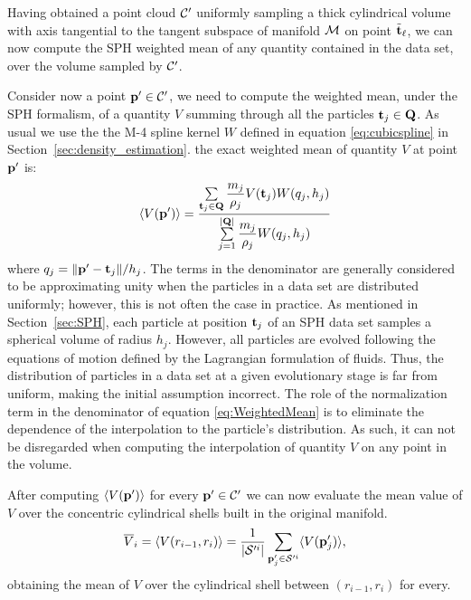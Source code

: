 Having obtained a point cloud $\mathcal{C}'$ uniformly sampling a thick cylindrical volume with axis tangential to the tangent subspace of manifold $\mathcal{M}$ on point $\tilde{\boldsymbol{\mathbf{t}}}_\ell$,
we can now compute the SPH weighted mean of any quantity contained in the data set, over the volume sampled by $\mathcal{C}'$.

Consider now a point $\boldsymbol{\mathbf{p}}' \in \mathcal{C}'$, we need to compute the weighted mean, under the SPH formalism, of a quantity $V$ summing through all the particles $\boldsymbol{\mathbf{t}}_j \in \boldsymbol{\mathbf{Q}}$.
As usual we use the the M-4 spline kernel $W$ defined in equation \eqref{eq:cubicspline} in Section~\ref{sec:density_estimation}.
the exact weighted mean of quantity $V$ at point $\boldsymbol{\mathbf{p}}'$ is:
\begin{equation}\label{eq:WeightedMean}
  \langle V(\boldsymbol{\mathbf{p}}') \rangle = \dfrac{\sum\limits_{\boldsymbol{\mathbf{t}}_j \in \boldsymbol{\mathbf{Q}}} \dfrac{m_j}{\rho_j} V(\boldsymbol{\mathbf{t}}_j) W(q_j,h_j)}{\sum\limits_{j=1}^{|\boldsymbol{\mathbf{Q}}|} \dfrac{m_j}{\rho_j} W(q_j,h_j)}
\end{equation}
where $q_j = \norm{\boldsymbol{\mathbf{p}}' - \boldsymbol{\mathbf{t}}_j}/h_j$.
The terms in the denominator are generally considered to be approximating unity when the particles in a data set are distributed uniformly; however, this is not often the case in practice.
As mentioned in Section~\ref{sec:SPH}, each particle at position $\boldsymbol{\mathbf{t}}_j$ of an SPH data set samples a spherical volume of radius $h_j$.
However, all particles are evolved following the equations of motion defined by the Lagrangian formulation of fluids.
Thus, the distribution of particles in a data set at a given evolutionary stage is far from uniform, making the initial assumption incorrect.
The role of the normalization term
in the denominator of equation \ref{eq:WeightedMean} is to eliminate the dependence of the interpolation to the particle's distribution.
As such, it can not be disregarded when computing the interpolation of quantity $V$ on any point in the volume.

After computing $\langle V(\boldsymbol{\mathbf{p}}')\rangle$ for every $\boldsymbol{\mathbf{p}}' \in \mathcal{C}'$ we can now evaluate the mean value of $V$ over the concentric cylindrical shells built in the original manifold.%
\begin{equation}
  \overline{V}_{i} = \langle V(r_{i-1},r_i)\rangle = \frac{1}{|\mathcal{S}'^i|} \sum_{\boldsymbol{\mathbf{p}}'_j \in \mathcal{S}'^i} \langle V(\boldsymbol{\mathbf{p}}'_j)\rangle,
\end{equation}
obtaining the mean of $V$ over the cylindrical shell between $(r_{i-1},r_i)$ for every.

